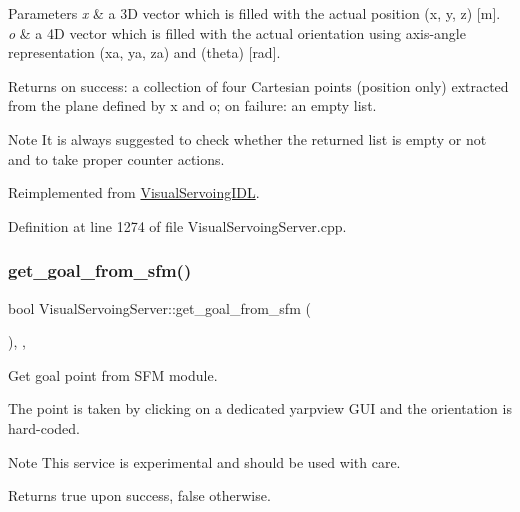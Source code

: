 \begin{DoxyParams}{Parameters}
{\em x} & a 3D vector which is filled with the actual position (x, y, z) \mbox{[}m\mbox{]}. \\
\hline
{\em o} & a 4D vector which is filled with the actual orientation using axis-\/angle representation (xa, ya, za) and (theta) \mbox{[}rad\mbox{]}. \\
\hline
\end{DoxyParams}
\begin{DoxyReturn}{Returns}
on success\+: a collection of four Cartesian points (position only) extracted from the plane defined by x and o; on failure\+: an empty list. 
\end{DoxyReturn}
\begin{DoxyNote}{Note}
It is always suggested to check whether the returned list is empty or not and to take proper counter actions. 
\end{DoxyNote}


Reimplemented from \hyperlink{classVisualServoingIDL_a175b2d3fb77000e0012c7a8d16e9a379}{Visual\+Servoing\+I\+DL}.



Definition at line 1274 of file Visual\+Servoing\+Server.\+cpp.

\mbox{\label{classVisualServoingServer_a3b0e5078c2f32493a2ef31ea32450d80}} 
\subsubsection{\texorpdfstring{get\+\_\+goal\+\_\+from\+\_\+sfm()}{get\_goal\_from\_sfm()}}
{\footnotesize\ttfamily bool Visual\+Servoing\+Server\+::get\+\_\+goal\+\_\+from\+\_\+sfm (\begin{DoxyParamCaption}{ }\end{DoxyParamCaption})\hspace{0.3cm}{\ttfamily [override]}, {\ttfamily [protected]}, {\ttfamily [virtual]}}



Get goal point from S\+FM module. 

The point is taken by clicking on a dedicated \textquotesingle{}yarpview\textquotesingle{} G\+UI and the orientation is hard-\/coded. \begin{DoxyNote}{Note}
This service is experimental and should be used with care. 
\end{DoxyNote}
\begin{DoxyReturn}{Returns}
true upon success, false otherwise. 
\end{DoxyReturn}


